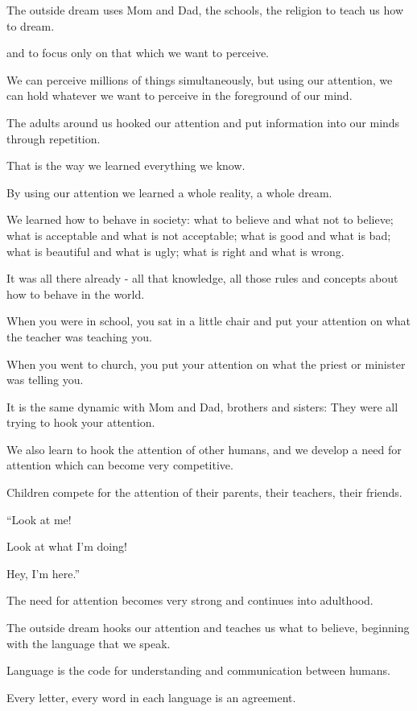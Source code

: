 \documentclass{article}
\numberwithin{equation}{section}
\begin{document}
The outside dream uses Mom and Dad, the schools, the religion to teach us how to dream.

%
 and to focus only on that which we want to perceive.

We can perceive millions of things simultaneously, but using our attention, we can hold whatever we want to perceive in the foreground of our mind.

The adults around us hooked our attention and put information into our minds through repetition.

That is the way we learned everything we know.

%
By using our attention we learned a whole reality, a whole dream.

We learned how to behave in society: what to believe and what not to believe; what is acceptable and what is not acceptable; what is good and what is bad; what is beautiful and what is ugly; what is right and what is wrong.

It was all there already - all that knowledge, all those rules and concepts about how to behave in the world.

%
When you were in school, you sat in a little chair and put your attention on what the teacher was teaching you.

When you went to church, you put your attention on what the priest or minister was telling you.

It is the same dynamic with Mom and Dad, brothers and sisters: They were all trying to hook your attention.

We also learn to hook the attention of other humans, and we develop a need for attention which can become very competitive.

Children compete for the attention of their parents, their teachers, their friends.

``Look at me!

Look at what I'm doing!

Hey, I'm here.''

The need for attention becomes very strong and continues into adulthood.

%
The outside dream hooks our attention and teaches us what to believe, beginning with the language that we speak.

Language is the code for understanding and communication between humans.

Every letter, every word in each language is an agreement.
\end{document}
